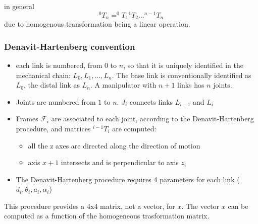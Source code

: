 \documentclass{book}
\begin{document}
in general
\[
    ^0T_n = ^0T_1 {^1}T_2 \dots ^{n-1}T_n
\]
due to homogenous transformation being a linear operation.

\subsubsection{Denavit-Hartenberg convention}
\begin{itemize}
    \item each link is numbered, from $0$ to $n$, so that it is uniquely identified in the mechanical chain: $L_0, L_1, \dots, L_n$. The base link is conventionally identified as $L_0$, the distal link as $L_n$. A manipulator with $n+1$ links has $n$ joints.
    \item Joints are numbered from $1$ to $n$. $J_i$ connects links $L_{i-1}$ and $L_i$
    \item Frames $\mathcal{F}_i$ are associated to each joint, according to the Denavit-Hartenberg procedure, and matrices $^{i-1}T_i$ are computed:\begin{itemize}
        \item all the z axes are directed along the direction of motion
        \item axis $x+1$ intersects and is perpendicular to axis $z_i$
    \end{itemize}
    \item The Denavit-Hartenberg procedure requires 4 parameters for each link ($d_i, \theta_i, a_i, \alpha_i$)
\end{itemize}

This procedure provides a 4x4 matrix, not a vector, for $x$. The vector $x$ can be computed as a function of the homogeneous trasformation matrix.
\end{document}
